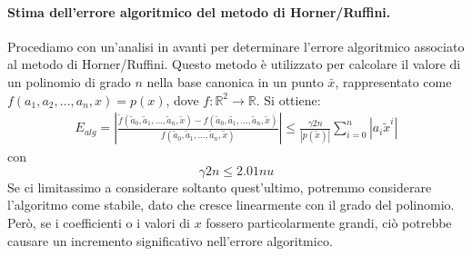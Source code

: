 \documentclass{article}
\begin{document}
\paragraph{Stima dell'errore algoritmico del metodo di Horner/Ruffini.}
Procediamo con un'analisi in avanti per determinare l'errore algoritmico
associato al metodo di Horner/Ruffini. Questo metodo è utilizzato per
calcolare il valore di un polinomio di grado $n$ nella base canonica 
in un punto $\bar{x}$, rappresentato come $f(a_1,a_2,\ldots,a_n,x)=p(x)$, 
dove $f:\mathbb{R}^2\rightarrow \mathbb{R}$. 
Si ottiene:
\begin{equation*}
   \begin{aligned}
       E_{alg}=\left\lvert
       \frac{\tilde{f}(\tilde{a}_0,\tilde{a}_1,\ldots,\tilde{a}_n,\tilde{x})-f(\tilde{a}_0,\tilde{a_1},\ldots,\tilde{a}_n,\tilde{x})}{f(\tilde{a}_0,\tilde{a}_1,
   \ldots,\tilde{a}_n,\tilde{x})}\right\rvert\leq \frac{\gamma2n}{\left\lvert
p(\tilde{x})\right\rvert}\displaystyle\sum_{i=0}^{n}\left\lvert a_i\tilde{x}^i\right\rvert
   \end{aligned}
\end{equation*}
con 
$$\gamma2n\leq2.01nu$$
Se ci limitassimo a considerare soltanto quest'ultimo, potremmo considerare
l'algoritmo come stabile, dato che cresce linearmente con il grado del polinomio. 
Però, se i coefficienti o i valori di $x$ fossero particolarmente grandi, ciò
potrebbe causare un incremento significativo nell'errore algoritmico.
\end{document}
